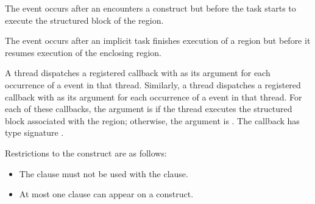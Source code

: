 \events

The  event occurs after an  encounters a
 construct but before the task starts to execute the structured
block of the  region.

The  event occurs after an implicit task finishes execution of 
a  region but before it resumes execution of the enclosing region.

\tools

A thread dispatches a registered  callback with 
 as its  argument for each 
occurrence of a  event  in that thread. Similarly, a 
thread dispatches a registered  callback  with 
 as its  argument for each occurrence 
of a  event in that thread. For each of these callbacks,
the  argument is  if the thread
executes the structured block associated with the  region;
otherwise, the  argument is  .
The callback has type signature .

\restrictions
Restrictions to the  construct are as follows:

\begin{itemize}
\item The  clause must not be used with the  clause.
\item At most one  clause can appear on a  construct.

\end{itemize}


